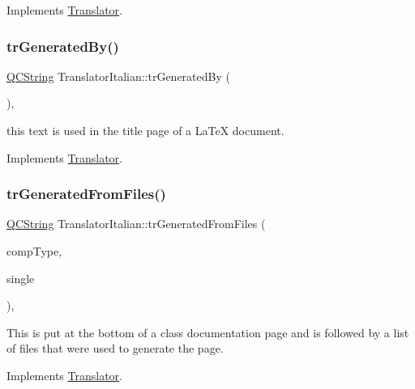 Implements \mbox{\hyperlink{class_translator}{Translator}}.

\mbox{\label{class_translator_italian_a3e56a91fa81539a017863f6ef9d4b5d6}} 
\subsubsection{\texorpdfstring{trGeneratedBy()}{trGeneratedBy()}}
{\footnotesize\ttfamily \mbox{\hyperlink{class_q_c_string}{Q\+C\+String}} Translator\+Italian\+::tr\+Generated\+By (\begin{DoxyParamCaption}{ }\end{DoxyParamCaption})\hspace{0.3cm}{\ttfamily [inline]}, {\ttfamily [virtual]}}

this text is used in the title page of a La\+TeX document. 

Implements \mbox{\hyperlink{class_translator}{Translator}}.

\mbox{\label{class_translator_italian_af10338d268d755ce3310a6b8d65f94dc}} 
\subsubsection{\texorpdfstring{trGeneratedFromFiles()}{trGeneratedFromFiles()}}
{\footnotesize\ttfamily \mbox{\hyperlink{class_q_c_string}{Q\+C\+String}} Translator\+Italian\+::tr\+Generated\+From\+Files (\begin{DoxyParamCaption}\item[{\mbox{\hyperlink{class_class_def_ae70cf86d35fe954a94c566fbcfc87939}{Class\+Def\+::\+Compound\+Type}}}]{comp\+Type,  }\item[{bool}]{single }\end{DoxyParamCaption})\hspace{0.3cm}{\ttfamily [inline]}, {\ttfamily [virtual]}}

This is put at the bottom of a class documentation page and is followed by a list of files that were used to generate the page. 

Implements \mbox{\hyperlink{class_translator}{Translator}}.

